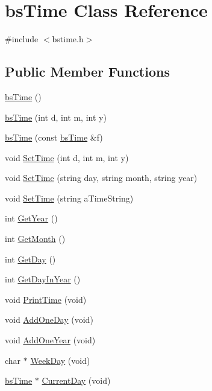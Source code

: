\hypertarget{classbs_time}{
\section{bsTime Class Reference}
\label{classbs_time}
}


{\ttfamily \#include $<$bstime.h$>$}\subsection*{Public Member Functions}
\begin{DoxyCompactItemize}
\item 
\hyperlink{classbs_time_ad87b7da7b60ced485c75776f81c03877}{bsTime} ()
\item 
\hyperlink{classbs_time_ae40faef2e2332ef495cba2deb75ee384}{bsTime} (int d, int m, int y)
\item 
\hyperlink{classbs_time_a48c518c543d62333bd024bfa8ac37624}{bsTime} (const \hyperlink{classbs_time}{bsTime} \&f)
\item 
void \hyperlink{classbs_time_add0778d27e5bad3ddd27d4a049c9d645}{SetTime} (int d, int m, int y)
\item 
void \hyperlink{classbs_time_ac182063c47984a4f6cfd9461c0e86f2e}{SetTime} (string day, string month, string year)
\item 
void \hyperlink{classbs_time_a88b9242a6a5369bee46e2e3f828db1cc}{SetTime} (string aTimeString)
\item 
int \hyperlink{classbs_time_afcb5953580c085bce20eb33a4b21e155}{GetYear} ()
\item 
int \hyperlink{classbs_time_a777a59c97951688c4b2a67c4b0bca16e}{GetMonth} ()
\item 
int \hyperlink{classbs_time_a3b4126cf9db93be0c2f69549699730d3}{GetDay} ()
\item 
int \hyperlink{classbs_time_a91f0b41e938320843b362bed6bc87ef2}{GetDayInYear} ()
\item 
void \hyperlink{classbs_time_a0606f87b994fa794e1241c3c0765e571}{PrintTime} (void)
\item 
void \hyperlink{classbs_time_a0386f6d4b49e3c0fd6f04f523dbfc7af}{AddOneDay} (void)
\item 
void \hyperlink{classbs_time_a45d7d97a8d867fe01e85db355a8f9a89}{AddOneYear} (void)
\item 
char $\ast$ \hyperlink{classbs_time_a1d544b0f50378bb2f1589423ae341199}{WeekDay} (void)
\item 
\hyperlink{classbs_time}{bsTime} $\ast$ \hyperlink{classbs_time_a1631d6b4f0748b820f09bdef6f273d1e}{CurrentDay} (void)

\end{DoxyCompactItemize}
